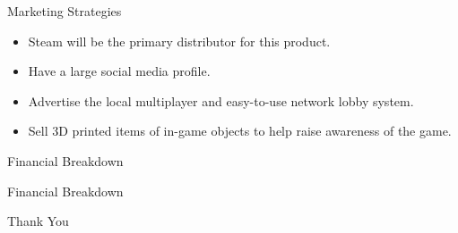 \documentclass{beamer}
\begin{document}
\begin{frame}{Marketing Strategies}
	\begin{itemize}		
	\item Steam will be the primary distributor for this product.\pause
	\item Have a large social media profile. \pause
	\item Advertise the local multiplayer and easy-to-use network lobby system. \pause
	\item Sell 3D printed items of in-game objects to help raise awareness of the game. \pause
	\end{itemize}
\end{frame}

\begin{frame}{Financial Breakdown}
\end{frame}

\begin{frame}{Financial Breakdown}
\end{frame}



\begin{frame}{Thank You}
\end{frame}
\end{document}
